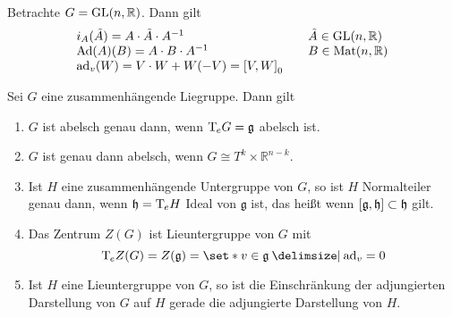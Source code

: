 \begin{beispiel*}[{name=[Adjungierte Darstellung der allgemeinen linearen Gruppe]}]
	Betrachte $G= \GL(n,\mathbb{R})$.
	Dann gilt
	\[
		\begin{array}{ll}
			i_A(\tilde{A}) = A \cdot \tilde{A} \cdot A^{-1} \quad & \tilde{A} \in \GL(n,\mathbb{R}) \\
			\Ad(A)(B) = A \cdot B \cdot A^{-1} & B \in \Mat(n,\mathbb{R}) \\
			\ad_v(W) = V \cdot W + W (-V) = \benbrace*{V,W}_0 \quad 
		\end{array}
	\]
\end{beispiel*}

\begin{lemma}[label=lem:154,{name=[über abelsche Liegruppen, Normalteiler und das Zentrum]}]
	Sei $G$ eine zusammenhängende Liegruppe. Dann gilt
	\begin{enumerate}[1)]
		\item $G$ ist abelsch genau dann, wenn $\Tmap_e G = \mathfrak{g}$ abelsch ist.
		\item $G$ ist genau dann abelsch, wenn $G \cong T^k \times \mathbb{R}^{n-k}$.
		\item Ist $H$ eine zusammenhängende Untergruppe von $G$, so ist $H$ Normalteiler genau dann, wenn $\mathfrak{h} = \Tmap_e H$ Ideal von $\mathfrak{g}$ ist, das heißt wenn $\benbrace*{\mathfrak{g},\mathfrak{h}} \subset \mathfrak{h}$ gilt.
		\item Das Zentrum $Z(G)$ ist Lieuntergruppe von $G$ mit 
		\[
			\Tmap_e Z(G) = Z(\mathfrak{g}) = \set*{v \in \mathfrak{g} \given \ad_v =0}
		\]
		\item Ist $H$ eine Lieuntergruppe von $G$, so ist die Einschränkung der adjungierten Darstellung von $G$ auf $H$ gerade die adjungierte Darstellung von $H$.
	\end{enumerate}
\end{lemma}
